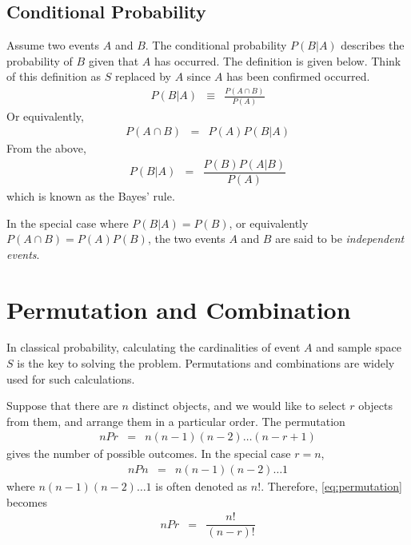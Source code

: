 \subsection{Conditional Probability}

Assume two events $A$ and $B$. The conditional probability $P(B|A)$ describes the probability of $B$ given that $A$ has occurred. The definition is given below. Think of this definition as $S$ replaced by $A$ since $A$ has been confirmed occurred.
\begin{eqnarray}
  P(B|A) &\equiv& \frac{P(A\cap B)}{P(A)} \nonumber
\end{eqnarray}
Or equivalently,
\begin{eqnarray}
  P(A\cap B) &=& P(A)P(B|A) \nonumber
\end{eqnarray}
From the above,
\begin{eqnarray}
  P(B|A) &=& \dfrac{P(B)P(A|B)}{P(A)} \nonumber
\end{eqnarray}
which is known as the Bayes' rule.

In the special case where $P(B|A)=P(B)$, or equivalently $P(A\cap B) = P(A)P(B)$, the two events $A$ and $B$ are said to be \textit{independent events}.

\section{Permutation and Combination}

In classical probability, calculating the cardinalities of event $A$ and sample space $S$ is the key to solving the problem. Permutations and combinations are widely used for such calculations.

Suppose that there are $n$ distinct objects, and we would like to select $r$ objects from them, and arrange them in a particular order. The permutation
\begin{eqnarray}
  nPr &=& n(n-1)(n-2)\ldots(n-r+1) \label{eq:permutation}
\end{eqnarray}
gives the number of possible outcomes. In the special case $r=n$,
\begin{eqnarray}
  nPn &=& n(n-1)(n-2)\ldots 1 \nonumber
\end{eqnarray}
where $n(n-1)(n-2)\ldots 1$ is often denoted as $n!$. Therefore, \eqref{eq:permutation} becomes
\begin{eqnarray}
  nPr &=& \dfrac{n!}{(n-r)!} \nonumber
\end{eqnarray}

